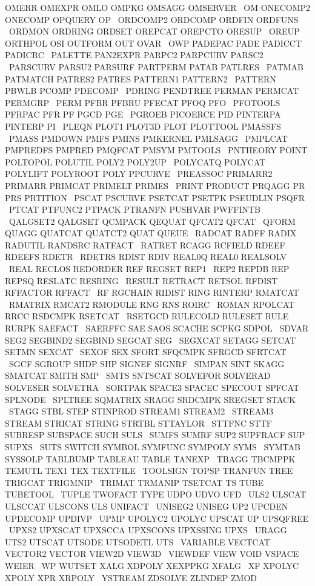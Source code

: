 \documentclass{article}
\begin{document}
     OMERR OMEXPR OMLO OMPKG OMSAGG OMSERVER \
     OM ONECOMP2 ONECOMP OPQUERY OP \
     ORDCOMP2 ORDCOMP ORDFIN ORDFUNS \
     ORDMON ORDRING ORDSET OREPCAT OREPCTO ORESUP \
     OREUP ORTHPOL OSI OUTFORM OUT OVAR \
     OWP PADEPAC PADE PADICCT PADICRC \
     PALETTE PAN2EXPR PARPC2 PARPCURV PARSC2 \
     PARSCURV PARSU2 PARSURF PARTPERM PATAB PATLRES \
     PATMAB PATMATCH PATRES2 PATRES PATTERN1 PATTERN2 \
     PATTERN PBWLB PCOMP PDECOMP \
     PDRING PENDTREE PERMAN PERMCAT PERMGRP \
     PERM PFBR PFBRU PFECAT PFOQ PFO \
     PFOTOOLS PFRPAC PFR PF PGCD PGE \
     PGROEB PICOERCE PID PINTERPA PINTERP PI \
     PLEQN PLOT1 PLOT3D PLOT PLOTTOOL PMASSFS \
     PMASS PMDOWN PMFS PMINS PMKERNEL PMLSAGG \
     PMPLCAT PMPREDFS PMPRED PMQFCAT PMSYM PMTOOLS \
     PNTHEORY POINT POLTOPOL POLUTIL POLY2 POLY2UP \
     POLYCATQ POLYCAT POLYLIFT POLYROOT POLY PPCURVE \
     PREASSOC PRIMARR2 PRIMARR PRIMCAT PRIMELT PRIMES \
     PRINT PRODUCT PRQAGG PR PRS PRTITION \
     PSCAT PSCURVE PSETCAT PSETPK PSEUDLIN PSQFR \
     PTCAT PTFUNC2 PTPACK PTRANFN PUSHVAR PWFFINTB \
     QALGSET2 QALGSET QCMPACK QEQUAT QFCAT2 QFCAT \
     QFORM QUAGG QUATCAT QUATCT2 QUAT QUEUE \
     RADCAT RADFF RADIX RADUTIL RANDSRC RATFACT \
     RATRET RCAGG RCFIELD RDEEF RDEEFS RDETR \
     RDETRS RDIST RDIV REAL0Q REAL0 REALSOLV \
     REAL RECLOS REDORDER REF REGSET REP1 \
     REP2 REPDB REP REPSQ RESLATC RESRING \
     RESULT RETRACT RETSOL RFDIST RFFACTOR RFFACT \
     RF RGCHAIN RIDIST RING RINTERP RMATCAT \
     RMATRIX RMCAT2 RMODULE RNG RNS ROIRC \
     ROMAN RPOLCAT RRCC RSDCMPK RSETCAT \
     RSETGCD RULECOLD RULESET RULE RURPK SAEFACT \
     SAERFFC SAE SAOS SCACHE SCPKG SDPOL \
     SDVAR SEG2 SEGBIND2 SEGBIND SEGCAT SEG \
     SEGXCAT SETAGG SETCAT SETMN SEXCAT \
     SEXOF SEX SFORT SFQCMPK SFRGCD SFRTCAT \
     SGCF SGROUP SHDP SHP SIGNEF SIGNRF \
     SIMPAN SINT SKAGG SMATCAT SMITH SMP \
     SMTS SNTSCAT SOLVEFOR SOLVERAD SOLVESER SOLVETRA \
     SORTPAK SPACE3 SPACEC SPECOUT SPFCAT SPLNODE \
     SPLTREE SQMATRIX SRAGG SRDCMPK SREGSET STACK \
     STAGG STBL STEP STINPROD STREAM1 STREAM2 \
     STREAM3 STREAM STRICAT STRING STRTBL STTAYLOR \
     STTFNC STTF SUBRESP SUBSPACE SUCH SULS \
     SUMFS SUMRF SUP2 SUPFRACF SUP SUPXS \
     SUTS SWITCH SYMBOL SYMFUNC SYMPOLY SYMS \
     SYMTAB SYSSOLP TABLBUMP TABLEAU TABLE TANEXP \
     TBAGG TBCMPPK TEMUTL TEX1 TEX TEXTFILE \
     TOOLSIGN TOPSP TRANFUN TREE TRIGCAT TRIGMNIP \
     TRIMAT TRMANIP TSETCAT TS TUBE TUBETOOL \
     TUPLE TWOFACT TYPE UDPO UDVO UFD \
     ULS2 ULSCAT ULSCCAT ULSCONS ULS UNIFACT \
     UNISEG2 UNISEG UP2 UPCDEN UPDECOMP UPDIVP \
     UPMP UPOLYC2 UPOLYC UPSCAT UP UPSQFREE \
     UPXS2 UPXSCAT UPXSCCA UPXSCONS UPXSSING UPXS \
     URAGG UTS2 UTSCAT UTSODE UTSODETL UTS \
     VARIABLE VECTCAT VECTOR2 VECTOR VIEW2D VIEW3D \
     VIEWDEF VIEW VOID VSPACE WEIER \
     WP WUTSET XALG XDPOLY XEXPPKG XFALG \
     XF XPOLYC XPOLY XPR XRPOLY \
     YSTREAM ZDSOLVE ZLINDEP ZMOD
\end{document}
